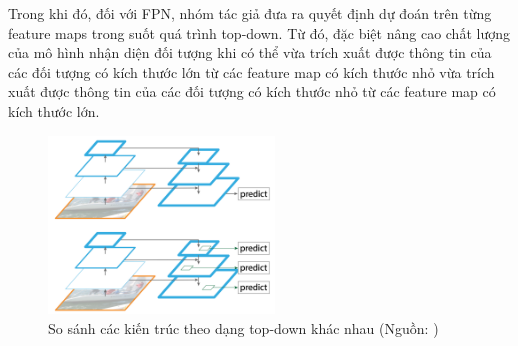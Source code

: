 {    \noindent
    Trong khi đó, đối với FPN, nhóm tác giả đưa ra quyết định dự đoán trên từng feature maps trong suốt quá trình top-down. Từ đó, đặc biệt nâng cao chất lượng của mô hình nhận diện đối tượng khi có thể vừa trích xuất được thông tin của các đối tượng có kích thước lớn từ các feature map có kích thước nhỏ vừa trích xuất được thông tin của các đối tượng có kích thước nhỏ từ các feature map có kích thước lớn.

    \begin{figure}[H]
        \centering
        \includegraphics[width=6cm] {images/fpn_topdown}
        \caption{So sánh các kiến trúc theo dạng top-down khác nhau (Nguồn: \cite{lin2017feature})}
        \label{fig:fpn_topdown}
    \end{figure}

}
